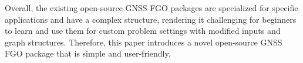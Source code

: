 Overall, the existing open-source GNSS FGO packages are specialized for specific applications and have a complex structure, rendering it challenging for beginners to learn and use them for custom problem settings with modified inputs and graph structures. Therefore, this paper introduces a novel open-source GNSS FGO package that is simple and user-friendly.

